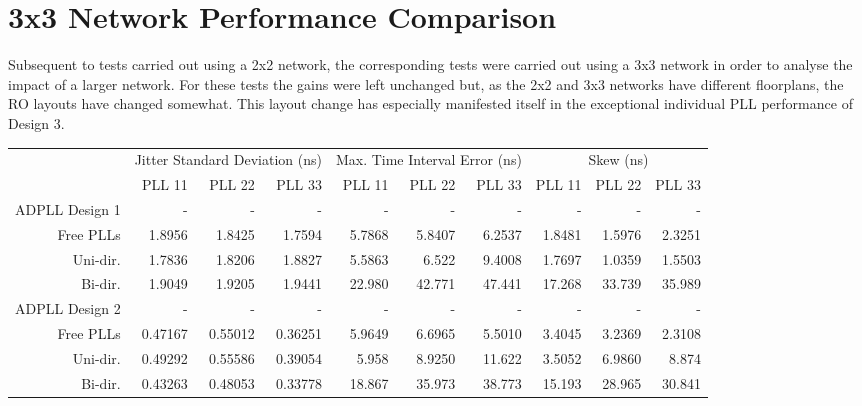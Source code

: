 \section{3x3 Network Performance Comparison}
Subsequent to tests carried out using a 2x2 network, the corresponding tests were carried out using a 3x3 network in order to analyse the impact of a larger network. For these tests the gains were left unchanged but, as the 2x2 and 3x3 networks have different floorplans, the \ac{RO} layouts have changed somewhat. This layout change has especially manifested itself in the exceptional individual \ac{PLL} performance of Design 3.

\begin{table}[!ht]
    \begin{center}
        \begin{footnotesize}
            \setlength{\tabcolsep}{.9\tabcolsep}
            \begin{tabular}{ll|r|r|r|r|r|r|r|r|r|}           
                \cline{3-11}
                && \multicolumn{3}{c|}{Jitter Standard Deviation (ns)} & \multicolumn{3}{c|}{Max. Time Interval Error (ns)} & \multicolumn{3}{c|}{Skew (ns)} \T\\
                \cline{3-11} 
                &&PLL 11&PLL 22&PLL 33    &PLL 11&PLL 22&PLL 33    &PLL 11&PLL 22&PLL 33 \T\\
                \hline
                \multicolumn{2}{|l|}{\ac{ADPLL} Design 1}&-&-&-&-&-&-&-&-&-\T\\
                \multicolumn{2}{|r|}{Free PLLs} &1.8956  &1.8425  &1.7594     &5.7868 &5.8407 &6.2537    &1.8481 &1.5976 &2.3251 \T\\
                \multicolumn{2}{|r|}{Uni-dir.}  &1.7836  &1.8206  &1.8827     &5.5863 &6.522  &9.4008    &1.7697 &1.0359 &1.5503 \T\\
                \multicolumn{2}{|r|}{Bi-dir.}   &1.9049  &1.9205  &1.9441     &22.980 &42.771 &47.441    &17.268 &33.739 &35.989 \T\\
                \hline
                \multicolumn{2}{|l|}{\ac{ADPLL} Design 2}&-&-&-&-&-&-&-&-&-\T\\
                \multicolumn{2}{|r|}{Free PLLs} &0.47167 &0.55012 &0.36251    &5.9649 &6.6965 &5.5010    &3.4045&3.2369&2.3108   \T\\
                \multicolumn{2}{|r|}{Uni-dir.}  &0.49292 &0.55586 &0.39054    &5.958  &8.9250 &11.622    &3.5052&6.9860&8.874    \T\\
                \multicolumn{2}{|r|}{Bi-dir.}   &0.43263 &0.48053 &0.33778    &18.867 &35.973 &38.773    &15.193&28.965&30.841   \T\\

\end{tabular}
\end{footnotesize}
\end{center}
\end{table}
